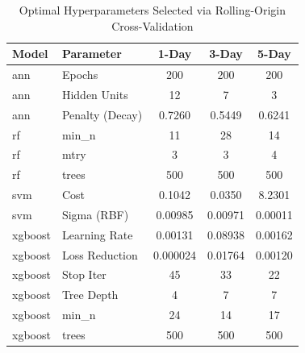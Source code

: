 \begin{table}[ht!]
\centering
\caption{\label{tab:best_hyperparameters}Optimal Hyperparameters Selected via Rolling-Origin Cross-Validation}
\small
\setlength{\tabcolsep}{6pt}
\begin{tabular}[t]{llccc}
\toprule
Model & Parameter & 1-Day & 3-Day & 5-Day\\
\midrule
ann & Epochs & 200 & 200 & 200\\
ann & Hidden Units & 12 & 7 & 3\\
ann & Penalty (Decay) & 0.7260 & 0.5449 & 0.6241\\
rf & min\_n & 11 & 28 & 14\\
rf & mtry & 3 & 3 & 4\\
\addlinespace
rf & trees & 500 & 500 & 500\\
svm & Cost & 0.1042 & 0.0350 & 8.2301\\
svm & Sigma (RBF) & 0.00985 & 0.00971 & 0.00011\\
xgboost & Learning Rate & 0.00131 & 0.08938 & 0.00162\\
xgboost & Loss Reduction & 0.000024 & 0.01764 & 0.00120\\
\addlinespace
xgboost & Stop Iter & 45 & 33 & 22\\
xgboost & Tree Depth & 4 & 7 & 7\\
xgboost & min\_n & 24 & 14 & 17\\
xgboost & trees & 500 & 500 & 500\\
\bottomrule
\end{tabular}
\end{table}
